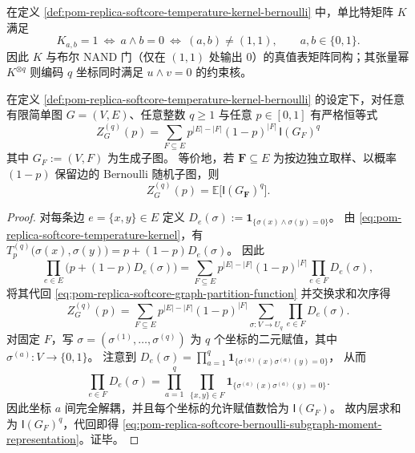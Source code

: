 \begin{remark}\label{rem:pom-replica-softcore-temperature-kernel-nand}
在定义 \ref{def:pom-replica-softcore-temperature-kernel-bernoulli} 中，单比特矩阵 \(K\) 满足
\[
K_{a,b}=1\ \Longleftrightarrow\ a\wedge b=0
\ \Longleftrightarrow\ (a,b)\neq(1,1),
\qquad a,b\in\{0,1\}.
\]
因此 \(K\) 与布尔 NAND 门（仅在 \((1,1)\) 处输出 \(0\)）的真值表矩阵同构；其张量幂 \(K^{\otimes q}\) 则编码 \(q\) 坐标同时满足 \(u\wedge v=0\) 的约束核。
\end{remark}




\begin{theorem}\label{thm:pom-replica-softcore-bernoulli-subgraph-moment-representation}
在定义 \ref{def:pom-replica-softcore-temperature-kernel-bernoulli} 的设定下，对任意有限简单图 \(G=(V,E)\)、任意整数 \(q\ge 1\) 与任意 \(p\in[0,1]\) 有严格恒等式
\begin{equation}\label{eq:pom-replica-softcore-bernoulli-subgraph-moment-representation}
\boxed{\;
Z_G^{(q)}(p)
=\sum_{F\subseteq E}p^{|E|-|F|}(1-p)^{|F|}\,\mathsf{I}(G_F)^{q}\;}
\end{equation}
其中 \(G_F:=(V,F)\) 为生成子图。
等价地，若 \(\mathbf{F}\subseteq E\) 为按边独立取样、以概率 \((1-p)\) 保留边的 Bernoulli 随机子图，则
\[
Z_G^{(q)}(p)=\mathbb{E}\bigl[\mathsf{I}(G_{\mathbf{F}})^{q}\bigr].
\]
\end{theorem}
\begin{proof}
对每条边 \(e=\{x,y\}\in E\) 定义
\(
D_e(\sigma):=\mathbf{1}_{\{\sigma(x)\wedge\sigma(y)=0\}}
\)。
由 \eqref{eq:pom-replica-softcore-temperature-kernel}，有
\(
T^{(q)}_p\bigl(\sigma(x),\sigma(y)\bigr)=p+(1-p)D_e(\sigma)
\)。
因此
\[
\prod_{e\in E}\bigl(p+(1-p)D_e(\sigma)\bigr)
=\sum_{F\subseteq E}p^{|E|-|F|}(1-p)^{|F|}\prod_{e\in F}D_e(\sigma),
\]
将其代回 \eqref{eq:pom-replica-softcore-graph-partition-function} 并交换求和次序得
\[
Z_G^{(q)}(p)
=\sum_{F\subseteq E}p^{|E|-|F|}(1-p)^{|F|}
\sum_{\sigma:V\to U_q}\prod_{e\in F}D_e(\sigma).
\]
对固定 \(F\)，写 \(\sigma=(\sigma^{(1)},\dots,\sigma^{(q)})\) 为 \(q\) 个坐标的二元赋值，其中 \(\sigma^{(a)}:V\to\{0,1\}\)。
注意到
\(
D_e(\sigma)=\prod_{a=1}^q\mathbf{1}_{\{\sigma^{(a)}(x)\sigma^{(a)}(y)=0\}}
\)，
从而
\[
\prod_{e\in F}D_e(\sigma)
=\prod_{a=1}^{q}\ \prod_{\{x,y\}\in F}\mathbf{1}_{\{\sigma^{(a)}(x)\sigma^{(a)}(y)=0\}}.
\]
因此坐标 \(a\) 间完全解耦，并且每个坐标的允许赋值数恰为 \(\mathsf{I}(G_F)\)。
故内层求和为 \(\mathsf{I}(G_F)^q\)，代回即得 \eqref{eq:pom-replica-softcore-bernoulli-subgraph-moment-representation}。证毕。
\end{proof}

